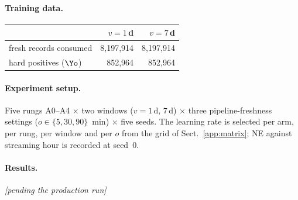 \paragraph{Training data.}
\begin{center}\small\begin{tabular}{lrr}
\toprule
 & $v=1$\,d & $v=7$\,d\\
\midrule
fresh records consumed & 8{,}197{,}914 & 8{,}197{,}914\\
hard positives ($\Yo$) & 852{,}964 & 852{,}964\\
\bottomrule
\end{tabular}\end{center}

\paragraph{Experiment setup.} Five rungs A0--A4 $\times$ two windows ($v=1$\,d, $7$\,d) $\times$ three pipeline-freshness settings ($o \in \{5, 30, 90\}$~min) $\times$ five seeds. The learning rate is selected per arm, per rung, per window and per $o$ from the grid of Sect.~\ref{app:matrix}; NE against streaming hour is recorded at seed~0.

\paragraph{Results.} \emph{[pending the production run]}

